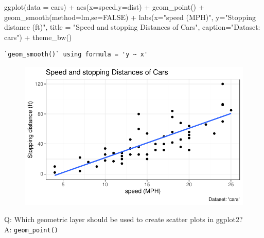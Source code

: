 \documentclass[
  letterpaper,
  DIV=11,
  numbers=noendperiod]{scrartcl}
\newenvironment{Shaded}{\begin{snugshade}}{\end{snugshade}}
\newcommand{\AttributeTok}[1]{\textcolor[rgb]{0.40,0.45,0.13}{#1}}
\newcommand{\ConstantTok}[1]{\textcolor[rgb]{0.56,0.35,0.01}{#1}}
\newcommand{\FunctionTok}[1]{\textcolor[rgb]{0.28,0.35,0.67}{#1}}
\newcommand{\NormalTok}[1]{\textcolor[rgb]{0.00,0.23,0.31}{#1}}
\newcommand{\SpecialCharTok}[1]{\textcolor[rgb]{0.37,0.37,0.37}{#1}}
\newcommand{\StringTok}[1]{\textcolor[rgb]{0.13,0.47,0.30}{#1}}
\begin{document}
\begin{Shaded}
\begin{Highlighting}[]
\FunctionTok{ggplot}\NormalTok{(}\AttributeTok{data =}\NormalTok{ cars) }\SpecialCharTok{+} 
  \FunctionTok{aes}\NormalTok{(}\AttributeTok{x=}\NormalTok{speed,}\AttributeTok{y=}\NormalTok{dist) }\SpecialCharTok{+} 
  \FunctionTok{geom\_point}\NormalTok{() }\SpecialCharTok{+}
  \FunctionTok{geom\_smooth}\NormalTok{(}\AttributeTok{method=}\NormalTok{lm,}\AttributeTok{se=}\ConstantTok{FALSE}\NormalTok{) }\SpecialCharTok{+}
  \FunctionTok{labs}\NormalTok{(}\AttributeTok{x=}\StringTok{"speed (MPH)"}\NormalTok{, }
       \AttributeTok{y=}\StringTok{"Stopping distance (ft)"}\NormalTok{, }
       \AttributeTok{title =} \StringTok{"Speed and stopping Distances of Cars"}\NormalTok{, }
       \AttributeTok{caption=}\StringTok{"Dataset: \textquotesingle{}cars\textquotesingle{}"}\NormalTok{) }\SpecialCharTok{+}
  \FunctionTok{theme\_bw}\NormalTok{()}
\end{Highlighting}
\end{Shaded}

\begin{verbatim}
`geom_smooth()` using formula = 'y ~ x'
\end{verbatim}

\begin{figure}[H]

{\centering \includegraphics{class05_labreport_files/figure-pdf/unnamed-chunk-4-4.pdf}

}

\end{figure}

Q: Which geometric layer should be used to create scatter plots in
ggplot2?\\
A: \texttt{geom\_point()}
\end{document}
